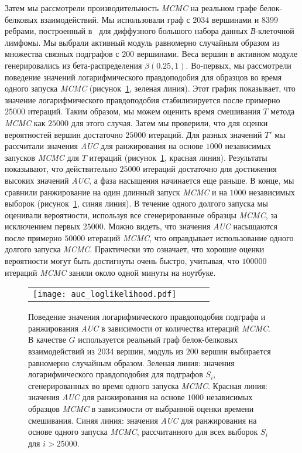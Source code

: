 Затем мы рассмотрели производительность \emph{MCMC} на реальном графе
белок-белковых взаимодействий.  Мы использовали граф с $2034$ вершинами
и $8399$ ребрами, построенный в~\cite{Dittrich2008a} для диффузного большого
набора данных \emph{В}-клеточной лимфомы.  Мы выбрали активный модуль
равномерно случайным образом из множества связных подграфов с $200$ вершинами.
Веса вершин в активном модуле генерировались из бета-распределения $\beta(0.25,
1)$.  Во-первых, мы рассмотрели поведение значений логарифмического
правдоподобия для образцов во время одного запуска \emph{MCMC}
(рисунок~\ref{fig:auclog}, зеленая линия).  Этот график показывает, что
значение логарифмического правдоподобия стабилизируется после примерно $25000$
итераций.  Таким образом, мы можем оценить время смешивания $T$ метода
\emph{MCMC} как $25000$ для этого случая.  Затем мы проверили, что для оценки
вероятностей вершин достаточно $25000$ итераций.  Для разных значений $T'$ мы
рассчитали значения \emph{AUC} для ранжирования на основе $1000$ независимых
запусков \emph{MCMC} для $T$ итераций (рисунок~\ref{fig:auclog}, красная
линия).  Результаты показывают, что действительно $25000$ итераций достаточно
для достижения высоких значений \emph{AUC}, а фаза насыщения начинается еще
раньше.  В конце, мы сравнили ранжирование на один длинный запуск \emph{MCMC}
и на $1000$ независимых выборок (рисунок~\ref{fig:auclog}, синяя линия).
В течение одного долгого запуска мы оценивали вероятности, используя все
сгенерированные образцы \emph{MCMC}, за исключением первых $25000$.  Можно
видеть, что значения \emph{AUC} насыщаются после примерно $50000$ итераций
\emph{MCMC}, что оправдывает использование одного долгого запуска \emph{MCMC}.
Практически это означает, что хорошие оценки вероятности могут быть достигнуты
очень быстро, учитывая, что $100000$ итераций \emph{MCMC} заняли около одной
минуты на ноутбуке.

\begin{figure}
    \centering
    \begin{tabular}{@{}cccc@{}}
        \texttt{[image: auc\_loglikelihood.pdf]}
    \end{tabular}
    \caption{
        Поведение значения логарифмического правдоподобия подграфа
        и ранжирования \emph{AUC} в зависимости от количества итераций
        \emph{MCMC}.  В качестве $G$ используется реальный граф белок-белковых
        взаимодействий из $2034$ вершин, модуль из $200$ вершин выбирается
        равномерно случайным образом.  Зеленая линия: значения логарифмического
        правдоподобия для подграфов $S_i$, сгенерированных во время одного
        запуска \emph{MCMC}.  Красная линия: значения \emph{AUC} для
        ранжирования на основе $1000$ независимых образцов \emph{MCMC}
        в зависимости от выбранной оценки времени смешивания.  Синяя линия:
        значения \emph{AUC} для ранжирования на основе одного запуска
        \emph{MCMC}, рассчитанного для всех выборок $S_i$ для $i > 25000$.
    }%
    \label{fig:auclog}%
\end{figure}

